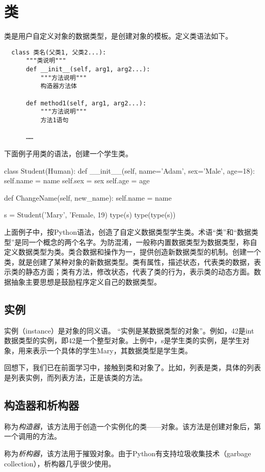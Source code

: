 \section{类}
类是用户自定义对象的数据类型，是创建对象的模板。定义类语法如下。
\begin{framed}
\begin{verbatim}
  class 类名(父类1, 父类2...):
      """类说明"""
      def __init__(self, arg1, arg2...):
          """方法说明"""
          构造器方法体

      def method1(self, arg1, arg2...):
          """方法说明"""
          方法1语句

      ……
\end{verbatim}
\end{framed}
下面例子用类的语法，创建一个学生类。
\begin{python}
class Student(Human): 
    def __init__(self, name='Adam', sex='Male', age=18):
        self.name = name
        self.sex = sex
        self.age = age

    def ChangeName(self, new_name):
        self.name = name
         
s = Student('Mary', 'Female, 19)
type(s)
type(type(s))
\end{python}
上面例子中，按Python语法，创造了自定义数据类型学生类。术语“类”和“数据类型”是同一个概念的两个名字。为防混淆，一般称内置数据类型为数据类型，称自定义数据类型为类。类合数据和操作为一，提供创造新数据类型的机制。创建一个类，就是创建了某种对象的新数据类型。类有属性，描述状态，代表类的数据，表示类的静态方面；类有方法，修改状态，代表了类的行为，表示类的动态方面。数据抽象主要思想是鼓励程序定义自己的数据类型。
\subsection{实例}
实例（instance）是对象的同义语。 “实例是某数据类型的对象”。例如，42是int数据类型的实例，即42是一个整型对象。上例中，s是学生类的实例，是学生对象，用来表示一个具体的学生Mary，其数据类型是学生类。

回想下，我们已在前面学习中，接触到类和对象了。比如，列表是类，具体的列表是列表实例，而列表方法，正是该类的方法。
\subsection{构造器和析构器}
称为\emph{构造器}，该方法用于创造一个实例化的类——对象。该方法是创建对象后，第一个调用的方法。

称为\emph{析构器}，该方法用于摧毁对象。由于Python有支持垃圾收集技术（garbage collection），析构器几乎很少使用。
